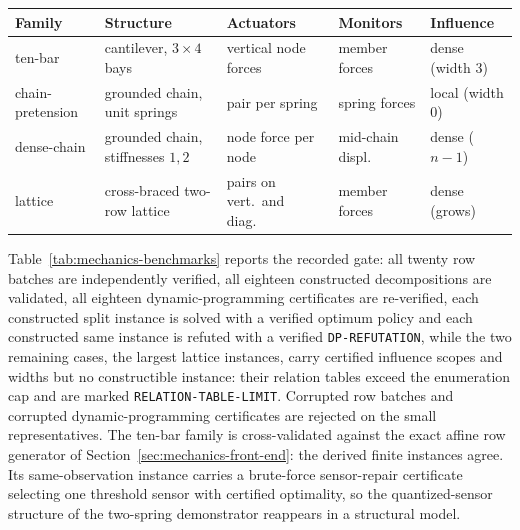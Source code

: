 \documentclass[11pt]{article}
\theoremstyle{plain}
\theoremstyle{definition}
\theoremstyle{remark}
\begin{document}
\begin{center}
\footnotesize
\begin{tabular}{@{}lllll@{}}
\toprule
Family & Structure & Actuators & Monitors & Influence\\
\midrule
ten-bar & cantilever, \(3\times4\) bays & vertical node forces & member forces & dense (width 3)\\
chain-pretension & grounded chain, unit springs & pair per spring & spring forces & local (width 0)\\
dense-chain & grounded chain, stiffnesses \(1,2\) & node force per node & mid-chain displ.\ & dense (\(n-1\))\\
lattice & cross-braced two-row lattice & pairs on vert.\ and diag.\ & member forces & dense (grows)\\
\bottomrule
\end{tabular}
\label{tab:mechanics-families}
\end{center}

Table~\ref{tab:mechanics-benchmarks} reports the recorded gate: all twenty
row batches are independently verified, all eighteen constructed
decompositions are validated, all eighteen dynamic-programming certificates
are re-verified, each constructed split instance is solved with a verified
optimum policy and each constructed same instance is refuted with a verified
\texttt{DP-REFUTATION}, while the two remaining cases, the largest lattice
instances, carry certified influence scopes and widths but no constructible
instance: their relation tables exceed the enumeration cap and are marked
\texttt{RELATION-TABLE-LIMIT}.  Corrupted row batches and
corrupted dynamic-programming certificates are rejected on the small
representatives.  The ten-bar family is cross-validated against the exact
affine row generator of Section~\ref{sec:mechanics-front-end}: the derived
finite instances agree.  Its same-observation instance carries a brute-force
sensor-repair certificate selecting one threshold sensor with certified
optimality, so the quantized-sensor structure of the two-spring demonstrator
reappears in a structural model.
\end{document}
